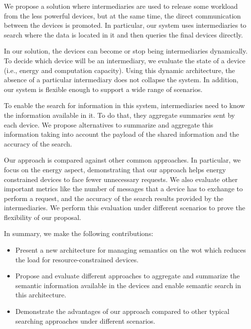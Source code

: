 We propose a solution where intermediaries are used to release some workload from the less powerful devices, but at the same time, the direct communication between the devices is promoted.
In particular, our system uses intermediaries to search where the data is located in it and then queries the final devices directly. %

In our solution, the devices can become or stop being intermediaries dynamically.
To decide which device will be an intermediary, we evaluate the state of a device (i.e., energy and computation capacity).
Using this dynamic architecture, the absence of a particular intermediary does not collapse the system.
In addition, our system is flexible enough to support a wide range of scenarios.

To enable the search for information in this system, intermediaries need to know the information available in it.
To do that, they aggregate summaries sent by each device.
We propose alternatives to summarize and aggregate this information taking into account the payload of the shared information and the accuracy of the search.

Our approach is compared against other common approaches.
In particular, we focus on the energy aspect, demonstrating that our approach helps energy constrained devices to face fewer unnecessary requests.
We also evaluate other important metrics like the number of messages that a device has to exchange to perform a request, and the accuracy of the search results provided by the intermediaries.
We perform this evaluation under different scenarios to prove the flexibility of our proposal.

In summary, we make the following contributions:
\begin{itemize}
\item Present a new architecture for managing semantics on the \ac{wot} which reduces the load for resource-constrained devices.
\item Propose and evaluate different approaches to aggregate and summarize the semantic information available in the devices and enable semantic search in this architecture.
\item Demonstrate the advantages of our approach compared to other typical searching approaches under different scenarios.
\end{itemize}

